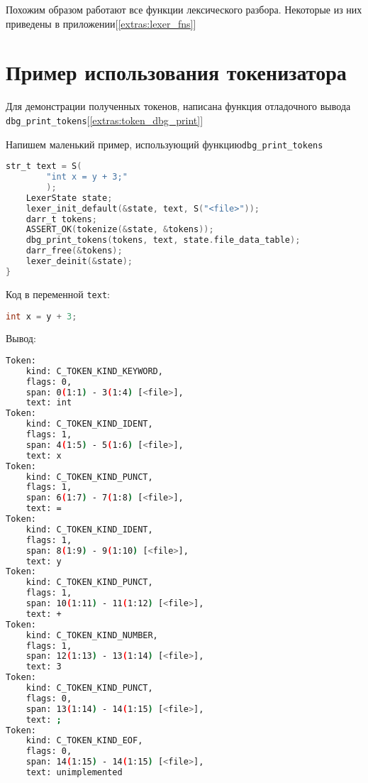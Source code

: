Похожим образом работают все функции лексического разбора.
Некоторые из них приведены в приложении[\ref{extras:lexer_fns}]

\clearpage
\section{Пример использования токенизатора}

Для демонстрации полученных токенов, написана функция отладочного вывода \verb|dbg_print_tokens|[\ref{extras:token_dbg_print}]

Напишем маленький пример, использующий функцию\newline \verb|dbg_print_tokens|
\begin{lstlisting}[language=c, caption={Пример использования лексера}, label={lexing:lexer-usage-ex}]
    str_t text = S(
        "int x = y + 3;"
        );
    LexerState state;
    lexer_init_default(&state, text, S("<file>"));
    darr_t tokens;
    ASSERT_OK(tokenize(&state, &tokens));
    dbg_print_tokens(tokens, text, state.file_data_table);
    darr_free(&tokens);
    lexer_deinit(&state);
}
\end{lstlisting}

Код в переменной \verb|text|:
\begin{lstlisting}[language=c, caption={Входные данные примера}, label={lexing:usage-ex-in}]
int x = y + 3;
\end{lstlisting}

Вывод:

\begin{lstlisting}[language=bash, caption={Входные данные примера}, label={lexing:usage-ex-out}]
Token:
    kind: C_TOKEN_KIND_KEYWORD,
    flags: 0,
    span: 0(1:1) - 3(1:4) [<file>],
    text: int
Token:
    kind: C_TOKEN_KIND_IDENT,
    flags: 1,
    span: 4(1:5) - 5(1:6) [<file>],
    text: x
Token:
    kind: C_TOKEN_KIND_PUNCT,
    flags: 1,
    span: 6(1:7) - 7(1:8) [<file>],
    text: =
Token:
    kind: C_TOKEN_KIND_IDENT,
    flags: 1,
    span: 8(1:9) - 9(1:10) [<file>],
    text: y
Token:
    kind: C_TOKEN_KIND_PUNCT,
    flags: 1,
    span: 10(1:11) - 11(1:12) [<file>],
    text: +
Token:
    kind: C_TOKEN_KIND_NUMBER,
    flags: 1,
    span: 12(1:13) - 13(1:14) [<file>],
    text: 3
Token:
    kind: C_TOKEN_KIND_PUNCT,
    flags: 0,
    span: 13(1:14) - 14(1:15) [<file>],
    text: ;
Token:
    kind: C_TOKEN_KIND_EOF,
    flags: 0,
    span: 14(1:15) - 14(1:15) [<file>],
    text: unimplemented
\end{lstlisting}

